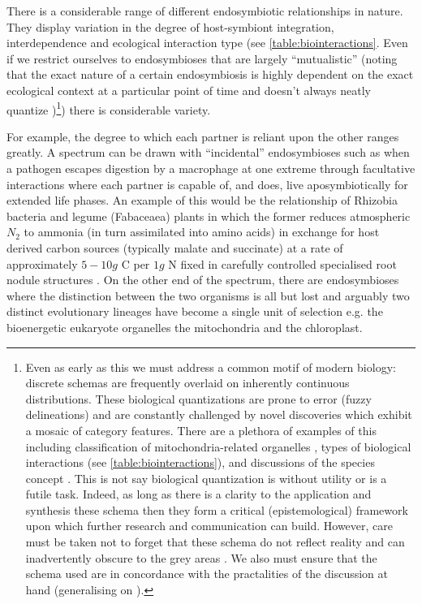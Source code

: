 There is a considerable range of different endosymbiotic relationships in nature. They display variation in the 
degree of host-symbiont integration, interdependence and ecological interaction type (see \ref{table:biointeractions}.  
Even if we restrict ourselves to endosymbioses that are largely ``mutualistic'' (noting that the exact nature of
a certain endosymbiosis is highly dependent on the exact ecological context at a particular point of time and doesn't
always neatly quantize \citep{Leung2008})\footnote{Even as early as this we 
    must address a common motif of modern biology: discrete schemas are frequently 
    overlaid on inherently continuous distributions.  These biological quantizations are prone to error (fuzzy delineations)
    and are constantly challenged by novel discoveries which exhibit a mosaic of category features.  
    There are a plethora of examples of this including classification of 
    mitochondria-related organelles \citep{Maguire2014}, types of biological interactions 
    (see \ref{table:biointeractions}), and discussions of the species concept \citep{DeQueiroz2007,Boenigk2012}.
    This is not say biological quantization is without utility or is a futile task.  Indeed, as long as there is a clarity to 
    the application and synthesis these schema then they form a critical (epistemological) framework upon which further 
    research and communication can build. 
    However, care must be taken not to forget that these schema do not reflect reality and can inadvertently obscure
    to the grey areas \citep{Leung2008}.  We also must ensure that the schema used are in concordance with the practalities of the 
discussion at hand (generalising on \citep{Boenigk2012}).}) there is considerable variety.

For example, the degree to which each partner is reliant upon the other ranges greatly. 
A spectrum can be drawn with ``incidental'' endosymbioses such as when a pathogen
escapes digestion by a macrophage at one extreme through facultative interactions where each partner is
capable of, and does, live aposymbiotically for extended life phases. An example of this would be the relationship of
Rhizobia bacteria and legume (Fabaceaea) plants in which the former reduces atmospheric \(N_{2}\) to ammonia (in turn
assimilated into amino acids) \citep{Hirsch1992} in exchange for host derived carbon sources (typically malate 
and succinate) \citep{Prell2006} at a rate of approximately \(5-10g\) C per \(1g\) N 
fixed \citep{Phillips1980} in carefully controlled specialised root nodule structures \citep{Crespi2008}.
On the other end of the spectrum, there are endosymbioses where the distinction between the two organisms is 
all but lost and arguably two distinct evolutionary lineages have become a single unit of selection 
e.g. the bioenergetic eukaryote organelles the mitochondria and the chloroplast. 

